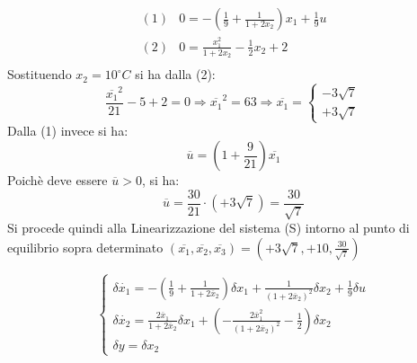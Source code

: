 \documentclass[a4paper]{report}
\begin{document}
\[
  \begin{array}{ll}
    (1) & 0 = - \left( \frac{1}{9} + \frac{1}{1 + 2x_2}\right)x_1 +
    \frac{1}{9}u\\
    (2) & 0 = \frac{x_1^2}{1 + 2x_2} - \frac{1}{2}x_2 + 2\\
  \end{array}
\]
Sostituendo $x_2 = 10 ^{\circ}C$ si ha dalla (2):
\[
  \dfrac{\overline{x_1}^2}{21} - 5 + 2 = 0 \Rightarrow \overline{x_1}^2
  = 63 \Rightarrow \overline{x_1} = 
  \left\{
  \begin{array}{l}
    -3 \sqrt{7}\\
    +3 \sqrt{7}
  \end{array} \right .
\]
Dalla (1) invece si ha: $$\overline{u} = \left(1 +
\frac{9}{21}\right)\overline{x_1}$$
Poich\`e deve essere $\overline{u} > 0$, si ha: $$ \overline{u} =
\frac{30}{21} \cdot (+3\sqrt{7}) = \frac{30}{\sqrt{7}}$$
Si procede quindi alla Linearizzazione del sistema (S) intorno al
punto di equilibrio sopra determinato $(\overline{x_1},
\overline{x_2}, \overline{x_3}) = \left(+3\sqrt{7}, +10, \frac{30}{\sqrt{7}}\right)$

\[
  \left\{
  \begin{array}{l}
    \delta \dot{x_1} = - \left( \frac{1}{9} + \frac{1}{1 +
      2\overline{x}_2}\right)\delta x_1 + \frac{1}{(1 +
      2\overline{x}_2)^2}\delta x_2 + \frac{1}{9} \delta u\\
    \delta \dot{x_2} = \frac{2 \overline{x}_1}{1 + 2 \overline{x}_2}
    \delta x_1 + \left( - \frac{2 \overline{x}_1^2}{(1 + 2
      \overline{x}_2)^2} - \frac{1}{2} \right) \delta x_2\\
    \delta y = \delta x_2
  \end{array}
  \right .
\]
\end{document}
